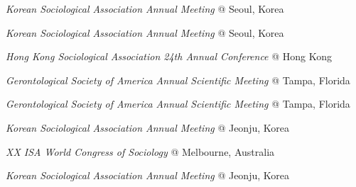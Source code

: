 \begin{aka}
    \item[2023]
    \begin{akb}
        \item \textit{Korean Sociological Association Annual Meeting} @ Seoul, Korea
    \end{akb}

    \item [2023]
    \begin{akb}
        \item \textit{Korean Sociological Association Annual Meeting} @ Seoul, Korea
    \end{akb}

    \item [2023]
    \begin{akb}
        \item \textit{Hong Kong Sociological Association 24th Annual Conference} @ Hong Kong
        \item \textit{Gerontological Society of America Annual Scientific Meeting} @ Tampa, Florida
    \end{akb}

    \item [2023]
    \begin{akb}
        \item \textit{Gerontological Society of America Annual Scientific Meeting} @ Tampa, Florida
        \item \textit{Korean Sociological Association Annual Meeting} @ Jeonju, Korea
    \end{akb}

    \item [2023]
    \begin{akb}
        \item \textit{XX ISA World Congress of Sociology} @ Melbourne, Australia
    \end{akb}

    \item [2023]
    \begin{akb}
        \item \textit{Korean Sociological Association Annual Meeting} @ Jeonju, Korea
    \end{akb}


\end{aka}
